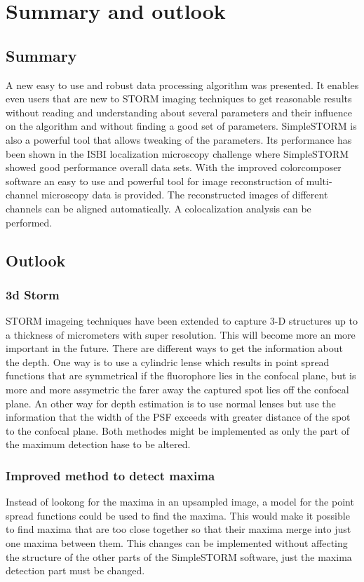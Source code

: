 \chapter{Summary and outlook}
\section{Summary}
A new easy to use and robust data processing algorithm was presented. It enables even users that are new to STORM imaging techniques to get reasonable results without reading and understanding about several parameters and their influence on the algorithm and without finding a good set of parameters.\newline
SimpleSTORM is also a powerful tool that allows tweaking of the parameters. Its performance has been shown in the ISBI localization microscopy challenge where SimpleSTORM showed good performance overall data sets.\newline
With the improved colorcomposer software an easy to use and powerful tool for image reconstruction of multi-channel microscopy data is provided. The reconstructed images of different channels can be aligned automatically. A colocalization analysis can be performed.
\section{Outlook}
\subsection{3d Storm}
STORM imageing techniques have been extended to capture 3-D structures up to a thickness of micrometers with super resolution. This will become more an more important in the future. There are different ways to get the information about the depth. One way is to use a cylindric lense which results in point spread functions that are symmetrical if the fluorophore lies in the confocal plane, but is more and more assymetric the farer away the captured spot lies off the confocal plane.\newline
An other way for depth estimation is to use normal lenses but use the information that the width of the PSF exceeds with greater distance of the spot to the confocal plane.\newline
Both methodes might be implemented as only the part of the maximum detection hase to be altered.
\subsection{Improved method to detect maxima}
Instead of lookong for the maxima in an upsampled image, a model for the point spread functions could be used to find the maxima. This would make it possible to find maxima that are too close together so that their maxima merge into just one maxima between them.\newline
This changes can be implemented without affecting the structure of the other parts of the SimpleSTORM software, just the maxima detection part must be changed.
